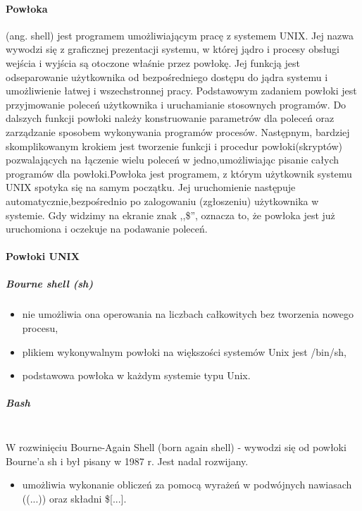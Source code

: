 \documentclass[]{report}
\begin{document}
\paragraph{Powłoka} (ang. shell) jest programem umożliwiającym pracę z systemem   UNIX. Jej nazwa wywodzi się z graficznej prezentacji systemu, w której jądro i procesy obsługi wejścia i wyjścia są otoczone właśnie przez powłokę. Jej funkcją jest odseparowanie użytkownika od bezpośredniego dostępu do jądra systemu i umożliwienie   łatwej i wszechstronnej pracy. Podstawowym zadaniem powłoki jest przyjmowanie     poleceń użytkownika i uruchamianie stosownych programów. Do dalszych funkcji powłoki należy konstruowanie parametrów dla poleceń oraz zarządzanie sposobem wykonywania programów procesów. Następnym, bardziej skomplikowanym krokiem jest tworzenie   funkcji i procedur powłoki(skryptów) pozwalających   na łączenie wielu   poleceń  w   jedno,umożliwiając pisanie całych programów dla powłoki.Powłoka jest programem, z którym użytkownik systemu UNIX spotyka się na samym początku. Jej uruchomienie   następuje   automatycznie,bezpośrednio po zalogowaniu (zgłoszeniu) użytkownika w systemie. Gdy widzimy na ekranie znak ,,\$'',   oznacza   to,  że   powłoka   jest   już uruchomiona i oczekuje na podawanie poleceń. 

\paragraph{Powłoki UNIX}

\subparagraph{Bourne shell (sh)}

\begin{itemize}
\item nie umożliwia ona operowania na liczbach całkowitych bez tworzenia nowego procesu,
\item plikiem wykonywalnym powłoki na większości systemów Unix jest /bin/sh,
\item  podstawowa powłoka w każdym systemie typu Unix.
\end{itemize}

\subparagraph{Bash\\\\}
W rozwinięciu Bourne-Again Shell (born again shell) - wywodzi się od powłoki Bourne'a sh i był pisany w 1987 r. Jest nadal rozwijany.
\begin{itemize}
\item umożliwia wykonanie obliczeń za pomocą wyrażeń w podwójnych nawiasach ((...)) oraz składni \$[...].
\end{itemize}
\end{document}
